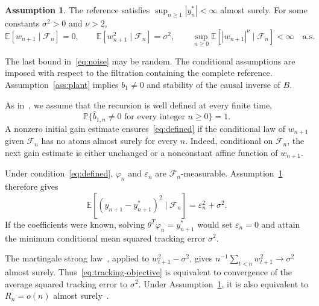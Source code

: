 \documentclass[11pt,reqno]{amsart}
\numberwithin{equation}{section}
\theoremstyle{definition}
\newtheorem{assumption}[theorem]{Assumption}
\theoremstyle{remark}
\newcommand{\E}{\mathbb E}
\newcommand{\Prob}{\mathbb P}
\newcommand{\F}{\mathcal F}
\newcommand{\bhat}{\widehat b}
\newcommand{\ph}{\varphi}
\begin{document}
\begin{assumption}\label{ass:noise}
The reference satisfies $\sup_{n\ge1}|y_n^*|<\infty$ almost surely. For some constants $\sigma^2>0$ and $\nu>2$,
\begin{equation}\label{eq:noise}
 \E\left[w_{n+1}\mid\F_n\right]=0,\qquad
 \E\left[w_{n+1}^2\mid\F_n\right]=\sigma^2,\qquad
 \sup_{n\ge0}\E\left[|w_{n+1}|^\nu\mid\F_n\right]<\infty
 \quad\text{a.s.}
\end{equation}
\end{assumption}

The last bound in~\eqref{eq:noise} may be random. The conditional assumptions are imposed with respect to the filtration containing the complete reference. Assumption~\ref{ass:plant} implies $b_1\ne0$ and stability of the causal inverse of $B$.

As in~\cite[eq.~(70)]{Guo95}, we assume that the recursion is well defined at every finite time,
\begin{equation}\label{eq:defined}
 \Prob\{\bhat_{1,n}\ne0\text{ for every integer }n\ge0\}=1.
\end{equation}
A nonzero initial gain estimate ensures~\eqref{eq:defined} if the conditional law of $w_{n+1}$ given $\F_n$ has no atoms almost surely for every $n$. Indeed, conditional on $\F_n$, the next gain estimate is either unchanged or a nonconstant affine function of $w_{n+1}$.

Under condition~\eqref{eq:defined}, $\ph_n$ and $\varepsilon_n$ are $\F_n$-measurable. Assumption~\ref{ass:noise} therefore gives
\[
 \E\left[(y_{n+1}-y_{n+1}^*)^2\mid\F_n\right]=\varepsilon_n^2+\sigma^2.
\]
If the coefficients were known, solving $\theta^T\ph_n=y_{n+1}^*$ would set $\varepsilon_n=0$ and attain the minimum conditional mean squared tracking error $\sigma^2$.

The martingale strong law~\cite[Theorem~2.18, pp.~35--36]{HallHeyde80}, applied to $w_{t+1}^2-\sigma^2$, gives $n^{-1}\sum_{t<n}w_{t+1}^2\to\sigma^2$ almost surely. Thus~\eqref{eq:tracking-objective} is equivalent to convergence of the average squared tracking error to $\sigma^2$. Under Assumption~\ref{ass:noise}, it is also equivalent to $R_n=o(n)$ almost surely~\cite[p.~437]{Guo95}.
\end{document}
